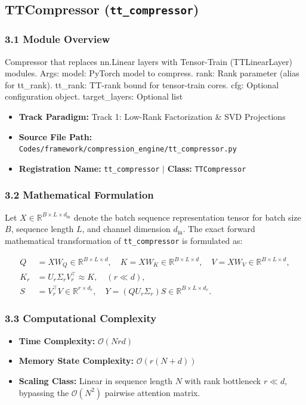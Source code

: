 \subsection{TTCompressor (\texttt{tt\_compressor})}
\label{sec:app_module_tt\_compressor}

\subsubsection*{3.1 Module Overview}
Compressor that replaces nn.Linear layers with Tensor-Train (TTLinearLayer) modules.  Args:     model: PyTorch model to compress.     rank: Rank parameter (alias for tt\_rank).     tt\_rank: TT-rank bound for tensor-train cores.     cfg: Optional configuration object.     target\_layers: Optional list
\begin{itemize}
    \item \textbf{Track Paradigm:} Track 1: Low-Rank Factorization & SVD Projections
    \item \textbf{Source File Path:} \texttt{Codes/framework/compression\_engine/tt\_compressor.py}
    \item \textbf{Registration Name:} \texttt{tt\_compressor} $\mid$ \textbf{Class:} \texttt{TTCompressor}
\end{itemize}

\subsubsection*{3.2 Mathematical Formulation}
Let $X \in \mathbb{R}^{B \times L \times d_{\text{in}}}$ denote the batch sequence representation tensor for batch size $B$, sequence length $L$, and channel dimension $d_{\text{in}}$. The exact forward mathematical transformation of \texttt{tt\_compressor} is formulated as:

\begin{align}
Q &= X W_Q \in \mathbb{R}^{B \times L \times d}, \quad K = X W_K \in \mathbb{R}^{B \times L \times d}, \quad V = X W_V \in \mathbb{R}^{B \times L \times d}, \\
K_r &= U_r \Sigma_r V_r^\top \approx K, \quad (r \ll d), \\
S &= V_r^\top V \in \mathbb{R}^{r \times d_v}, \quad Y = (Q U_r \Sigma_r) S \in \mathbb{R}^{B \times L \times d_v}.
\end{align}


\subsubsection*{3.3 Computational Complexity}
\begin{itemize}
    \item \textbf{Time Complexity:} $\mathcal{O}(N r d)$
    \item \textbf{Memory State Complexity:} $\mathcal{O}(r(N + d))$
    \item \textbf{Scaling Class:} Linear in sequence length $N$ with rank bottleneck $r \ll d$, bypassing the $\mathcal{O}(N^2)$ pairwise attention matrix.
\end{itemize}

